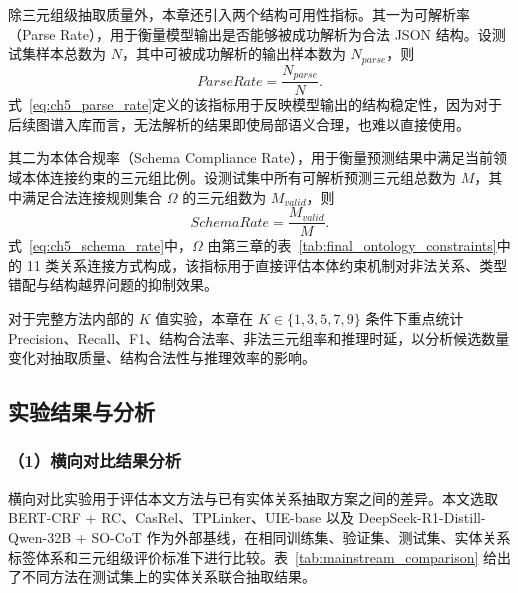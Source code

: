 除三元组级抽取质量外，本章还引入两个结构可用性指标。其一为可解析率（Parse Rate），用于衡量模型输出是否能够被成功解析为合法 JSON 结构。设测试集样本总数为 $N$，其中可被成功解析的输出样本数为 $N_{parse}$，则
\begin{equation}
ParseRate=\frac{N_{parse}}{N}.
\label{eq:ch5_parse_rate}
\end{equation}
式~\eqref{eq:ch5_parse_rate}定义的该指标用于反映模型输出的结构稳定性，因为对于后续图谱入库而言，无法解析的结果即使局部语义合理，也难以直接使用。

其二为本体合规率（Schema Compliance Rate），用于衡量预测结果中满足当前领域本体连接约束的三元组比例。设测试集中所有可解析预测三元组总数为 $M$，其中满足合法连接规则集合 $\Omega$ 的三元组数为 $M_{valid}$，则
\begin{equation}
SchemaRate=\frac{M_{valid}}{M}.
\label{eq:ch5_schema_rate}
\end{equation}
式~\eqref{eq:ch5_schema_rate}中，$\Omega$ 由第三章的表~\ref{tab:final_ontology_constraints}中的 11 类关系连接方式构成，该指标用于直接评估本体约束机制对非法关系、类型错配与结构越界问题的抑制效果。

对于完整方法内部的 $K$ 值实验，本章在 $K \in \{1,3,5,7,9\}$ 条件下重点统计 Precision、Recall、F1、结构合法率、非法三元组率和推理时延，以分析候选数量变化对抽取质量、结构合法性与推理效率的影响。

\subsection{实验结果与分析}

\subsubsection*{（1）横向对比结果分析}

横向对比实验用于评估本文方法与已有实体关系抽取方案之间的差异。本文选取 BERT-CRF + RC、CasRel、TPLinker、UIE-base 以及 DeepSeek-R1-Distill-Qwen-32B + SO-CoT 作为外部基线，在相同训练集、验证集、测试集、实体关系标签体系和三元组级评价标准下进行比较。表~\ref{tab:mainstream_comparison} 给出了不同方法在测试集上的实体关系联合抽取结果。

